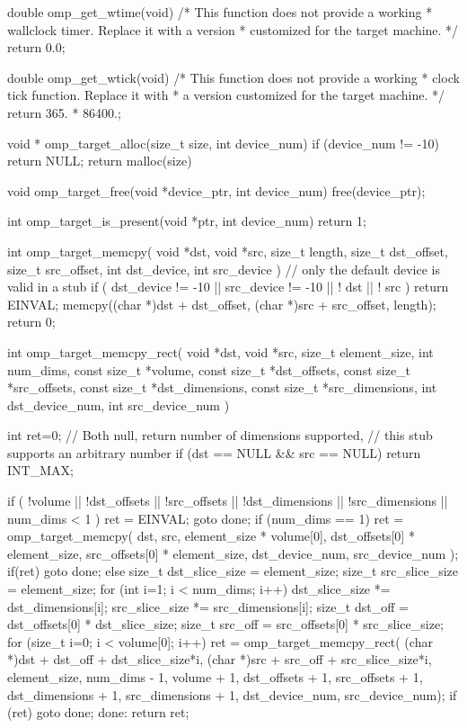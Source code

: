 {\begin{ompcFunction}
double omp_get_wtime(void)
{
  /* This function does not provide a working
   * wallclock timer. Replace it with a version
   * customized for the target machine.
   */
  return 0.0;
}

double omp_get_wtick(void)
{
  /* This function does not provide a working
   * clock tick function. Replace it with
   * a version customized for the target machine.
   */
  return 365. * 86400.;
}

void * omp_target_alloc(size_t size, int device_num)
{
  if (device_num != -10)
  return NULL;
  return malloc(size)
}

void omp_target_free(void *device_ptr, int device_num)
{
  free(device_ptr);
}

int omp_target_is_present(void *ptr, int device_num)
{
  return 1;
}

int omp_target_memcpy(
  void *dst,
  void *src,
  size_t length,
  size_t dst_offset,
  size_t src_offset,
  int dst_device,
  int src_device
)
{
  // only the default device is valid in a stub
  if (
    dst_device != -10 || src_device != -10
    || ! dst || ! src )
  return EINVAL;
  memcpy((char *)dst + dst_offset,
    (char *)src + src_offset,
    length);
  return 0;
}

int omp_target_memcpy_rect(
  void *dst,
  void *src,
  size_t element_size,
  int num_dims,
  const size_t *volume,
  const size_t *dst_offsets,
  const size_t *src_offsets,
  const size_t *dst_dimensions,
  const size_t *src_dimensions,
  int dst_device_num,
  int src_device_num
)
{
  int ret=0;
  // Both null, return number of dimensions supported,
  // this stub supports an arbitrary number
  if (dst == NULL && src == NULL) return INT_MAX;
  
  if (
    !volume || !dst_offsets || !src_offsets
    || !dst_dimensions || !src_dimensions
    || num_dims < 1 ) {
    ret = EINVAL;
    goto done;
  }
  if (num_dims == 1) {
    ret = omp_target_memcpy(
      dst,
      src,
      element_size * volume[0],
      dst_offsets[0] * element_size,
      src_offsets[0] * element_size,
      dst_device_num,
      src_device_num
    );
    if(ret) goto done;
  } else {
    size_t dst_slice_size = element_size;
    size_t src_slice_size = element_size;
    for (int i=1; i < num_dims; i++) {
      dst_slice_size *= dst_dimensions[i];
      src_slice_size *= src_dimensions[i];
    }
    size_t dst_off = dst_offsets[0] * dst_slice_size;
    size_t src_off = src_offsets[0] * src_slice_size;
    for (size_t i=0; i < volume[0]; i++) {
      ret = omp_target_memcpy_rect(
        (char *)dst + dst_off + dst_slice_size*i,
        (char *)src + src_off + src_slice_size*i,
        element_size,
        num_dims - 1,
        volume + 1,
        dst_offsets + 1,
        src_offsets + 1,
        dst_dimensions + 1,
        src_dimensions + 1,
        dst_device_num,
        src_device_num);
      if (ret) goto done;
    }
  }
  done:
  return ret;
}


\end{ompcFunction}}
